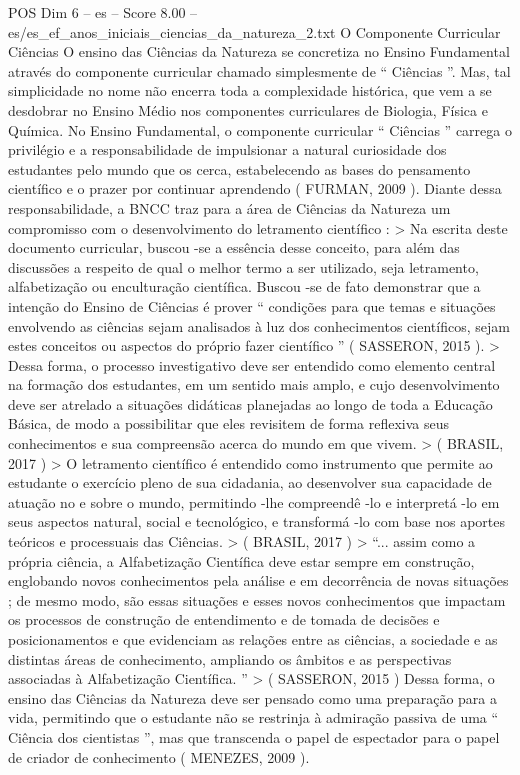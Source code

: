 \begin{textsample}{POS Dim 6 – es – Score 8.00 – es/es\_ef\_anos\_iniciais\_ciencias\_da\_natureza\_2.txt}  \label{ex:f6_pos_146}
O Componente Curricular Ciências O ensino das Ciências da Natureza se concretiza no Ensino Fundamental através do componente curricular chamado simplesmente de “ Ciências ”.
Mas, tal simplicidade no nome não encerra toda a complexidade histórica, que vem a se desdobrar no Ensino Médio nos componentes curriculares de Biologia, Física e Química.
No Ensino Fundamental, o componente curricular “ Ciências ” carrega o privilégio e a responsabilidade de impulsionar a natural curiosidade dos estudantes pelo mundo que os cerca, estabelecendo as bases do pensamento científico e o prazer por continuar aprendendo ( FURMAN, 2009 ).
Diante dessa responsabilidade, a BNCC traz para a área de Ciências da Natureza um compromisso com o desenvolvimento do letramento científico : > Na escrita deste documento curricular, buscou -se a essência desse conceito, para além das discussões a respeito de qual o melhor termo a ser utilizado, seja letramento, alfabetização ou enculturação científica.
Buscou -se de fato demonstrar que a intenção do Ensino de Ciências é prover “ condições para que temas e situações envolvendo as ciências sejam analisados à luz dos conhecimentos científicos, sejam estes conceitos ou aspectos do próprio fazer científico ” ( SASSERON, 2015 ). > Dessa forma, o processo investigativo deve ser entendido como elemento central na formação dos estudantes, em um sentido mais amplo, e cujo desenvolvimento deve ser atrelado a situações didáticas planejadas ao longo de toda a Educação Básica, de modo a possibilitar que eles revisitem de forma reflexiva seus conhecimentos e sua compreensão acerca do mundo em que vivem. > ( BRASIL, 2017 ) > O letramento científico é entendido como instrumento que permite ao estudante o exercício pleno de sua cidadania, ao desenvolver sua capacidade de atuação no e sobre o mundo, permitindo -lhe compreendê -lo e interpretá -lo em seus aspectos natural, social e tecnológico, e transformá -lo com base nos aportes teóricos e processuais das Ciências. > ( BRASIL, 2017 ) > “... assim como a própria ciência, a Alfabetização Científica deve estar sempre em construção, englobando novos conhecimentos pela análise e em decorrência de novas situações ; de mesmo modo, são essas situações e esses novos conhecimentos que impactam os processos de construção de entendimento e de tomada de decisões e posicionamentos e que evidenciam as relações entre as ciências, a sociedade e as distintas áreas de conhecimento, ampliando os âmbitos e as perspectivas associadas à Alfabetização Científica. ” > ( SASSERON, 2015 ) Dessa forma, o ensino das Ciências da Natureza deve ser pensado como uma preparação para a vida, permitindo que o estudante não se restrinja à admiração passiva de uma “ Ciência dos cientistas ”, mas que transcenda o papel de espectador para o papel de criador de conhecimento ( MENEZES, 2009 ).

\end{textsample}
